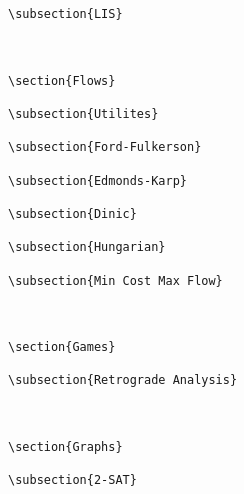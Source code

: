 {\begin{verbatim}
\subsection{LIS}



\section{Flows}

\subsection{Utilites}

\subsection{Ford-Fulkerson}

\subsection{Edmonds-Karp}

\subsection{Dinic}

\subsection{Hungarian}

\subsection{Min Cost Max Flow}



\section{Games}

\subsection{Retrograde Analysis}



\section{Graphs}

\subsection{2-SAT}


\end{verbatim}}
